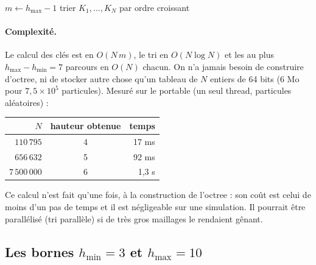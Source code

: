 \documentclass[11pt,a4paper]{article}
\newcommand{\code}[1]{\texttt{#1}}
\begin{document}
\begin{algorithm}[htb]
\caption{Hauteur de l'octree adaptée aux particules (\code{octreeHeight})}
\label{alg:height}
$m \leftarrow h_{\max} - 1$\;
trier $K_1, \dots, K_N$ par ordre croissant\;
\;
\end{algorithm}

\paragraph{Complexité.} Le calcul des clés est en $O(N\, m)$, le tri en $O(N \log N)$ et les
au plus $h_{\max} - h_{\min} = 7$ parcours en $O(N)$ chacun. On n'a jamais besoin de construire
d'octree, ni de stocker autre chose qu'un tableau de $N$ entiers de 64 bits (6 Mo pour
$7{,}5\times 10^5$ particules). Mesuré sur le portable (un seul thread, particules aléatoires) :
\begin{center}
\begin{tabular}{rcr}
\toprule
$N$ & hauteur obtenue & temps \\
\midrule
$110\,795$ & 4 & 17 ms \\
$656\,632$ & 5 & 92 ms \\
$7\,500\,000$ & 6 & 1,3 s \\
\bottomrule
\end{tabular}
\end{center}
Ce calcul n'est fait qu'une fois, à la construction de l'octree : son coût est celui de moins
d'un pas de temps et il est négligeable sur une simulation. Il pourrait être parallélisé
(tri parallèle) si de très gros maillages le rendaient gênant.

\subsection{\texorpdfstring{Les bornes $h_{\min} = 3$ et $h_{\max} = 10$}{Les bornes hmin = 3 et hmax = 10}}
\end{document}
